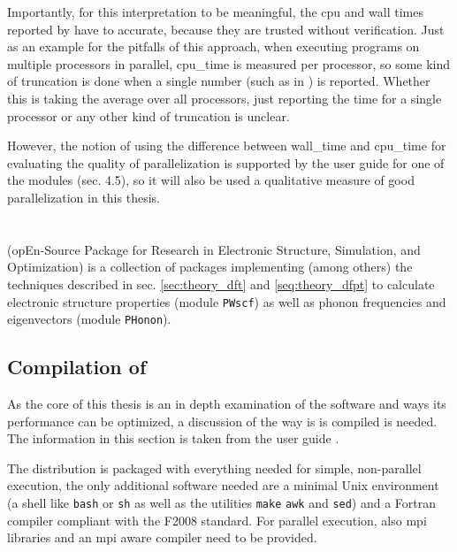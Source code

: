 \documentclass[main.tex]{subfiles}
\begin{document}
Importantly, for this interpretation to be meaningful, the cpu and wall times reported by \QE have to accurate, because they are trusted without verification.
Just as an example for the pitfalls of this approach, when executing programs on multiple processors in parallel, \gls{cpu_time} is measured per processor, so some kind of truncation is done when a single number (such as in \QE) is reported.
Whether this is taking the average over all processors, just reporting the time for a single processor or any other kind of truncation is unclear.

However, the notion of using the difference between \gls{wall_time} and \gls{cpu_time} for evaluating the quality of parallelization is supported by the user guide for one of the \QE modules \cite{noauthor_pwscf_nodate} (sec. 4.5), so it will also be used a qualitative measure of good parallelization in this thesis.

\section{\QE}\label{sec:qe}

\QE (opEn-Source Package for Research in Electronic Structure, Simulation, and Optimization) \cite{giannozzi_quantum_2009,giannozzi_advanced_2017} is a collection of packages implementing (among others) the techniques described in sec. \ref{sec:theory_dft} and \ref{seq:theory_dfpt} to calculate electronic structure properties (module \texttt{PWscf}) as well as phonon frequencies and eigenvectors (module \texttt{PHonon}).

\subsection{Compilation of \QE}\label{sub:qe_compilation}

As the core of this thesis is an in depth examination of the \QE software and ways its performance can be optimized, a discussion of the way is is compiled is needed.
The information in this section is taken from the  user guide \cite{noauthor_quantum_nodate}.

The \QE distribution is packaged with everything needed for simple, non-parallel execution, the only additional software needed are a minimal Unix environment (a shell like \texttt{bash} or \texttt{sh} as well as the utilities \texttt{make} \texttt{awk} and \texttt{sed}) and a Fortran compiler compliant with the F2008 standard.
For parallel execution, also \gls{mpi} libraries and an \gls{mpi} aware compiler need to be provided.
\end{document}
